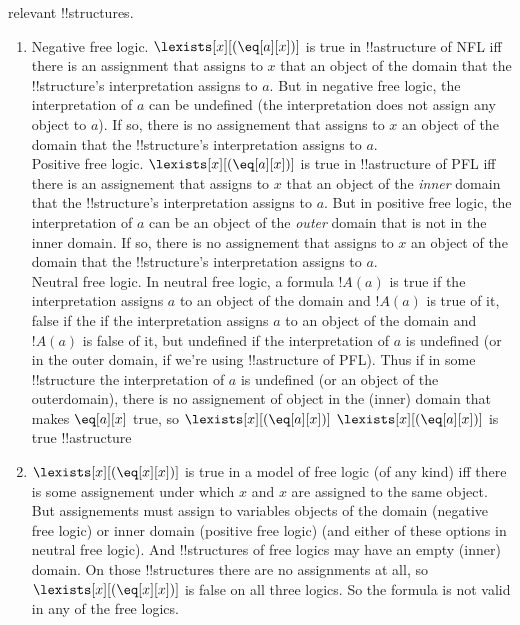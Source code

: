 \documentclass[../../../../include/open-logic-section]{subfiles}
\begin{document}
\begin{prob}[Semantics]
\begin{ans}
relevant !!{structure}s. 
\begin{enumerate}
\item Negative free logic. $\lexists[x][(\eq[a][x])]$ is true in !!a{structure} of NFL 
	iff there is an
	assignment that assigns to $x$ that an object of the domain that the !!{structure}'s
	interpretation assigns to $a$. But in negative free logic, the interpretation of $a$ can 
	be undefined (the interpretation does not assign any object to $a$). If so, there is no 
	assignement that assigns to $x$ an object of the domain that the !!{structure}'s 
	interpretation assigns to $a$.\\
	Positive free logic. $\lexists[x][(\eq[a][x])]$ is true in !!a{structure} of PFL iff there is an 
	assignement that assigns to $x$ that an object of the \emph{inner} domain that the 
	!!{structure}'s interpretation assigns to $a$. But in positive free logic, the 
	 interpretation of $a$ can 
	be an object of the \emph{outer} domain that is not in the inner domain. If so, there is
	no assignement that assigns to $x$ an object of the domain that the !!{structure}'s 
	interpretation assigns to $a$.\\
	Neutral free logic. In neutral free logic, a formula $!A(a)$ is true if the interpretation
	assigns $a$ to an object of the domain and $!A(a)$ is true of it, false if the if the 
	interpretation assigns $a$ to an object of the domain and $!A(a)$ is false of it, but 
	undefined if the interpretation of $a$ is undefined (or in the outer domain, if we're 
	using !!a{structure} of PFL). Thus if in some !!{structure} the interpretation of $a$ is
	undefined (or an object of the outerdomain), there is no assignement of object in the 
	(inner) domain that makes $\eq[a][x]$ true, so $\lexists[x][(\eq[a][x])]$
	 $\lexists[x][(\eq[a][x])]$ is true !!a{structure} 
\item $\lexists[x][(\eq[x][x])]$ is true in a model of free logic (of any kind) iff there is some 
	assignement under which $x$ and $x$ are assigned to the same object. But assignements 
	must assign to variables objects of the domain (negative free logic) or inner domain 
	(positive free logic) (and either of these options in neutral free logic). And 
	!!{structure}s of free logics may have an empty (inner) domain. On those !!{structure}s 
	there are no assignments at all, 
	so $\lexists[x][(\eq[x][x])]$ is false on all three logics. So the formula is not valid in any
	of the free logics.
\end{enumerate}
\end{ans}
\end{prob}
\end{document}
